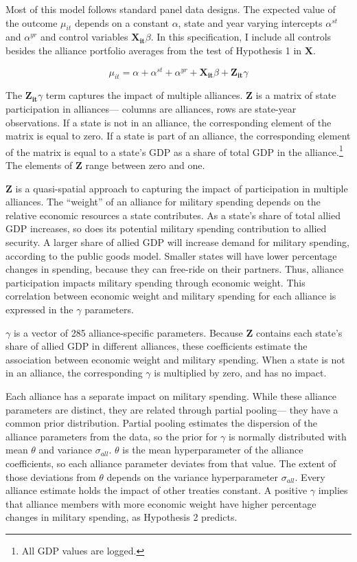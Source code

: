 \documentclass[12pt]{article}
\begin{document}
Most of this model follows standard panel data designs.
The expected value of the outcome $\mu_{it}$ depends on a constant $\alpha$, state and year varying intercepts $\alpha^{st}$ and $\alpha^{yr}$ and control variables $\mathbf{X_{it}} \beta$. 
In this specification, I include all controls besides the alliance portfolio averages from the test of Hypothesis 1 in $\mathbf{X}$.


\begin{equation}
\mu_{it} = \alpha + \alpha^{st} + \alpha^{yr} + \mathbf{X_{it}} \beta + \mathbf{Z_{it}} \gamma 
\end{equation}


The $\mathbf{Z_{it}} \gamma$ term captures the impact of multiple alliances. 
\textbf{Z} is a matrix of state participation in alliances--- columns are alliances, rows are state-year observations. 
If a state is not in an alliance, the corresponding element of the matrix is equal to zero. 
If a state is part of an alliance, the corresponding element of the matrix is equal to a state's GDP as a share of total GDP in the alliance.\footnote{All GDP values are logged.} 
The elements of \textbf{Z} range between zero and one. 


\textbf{Z} is a quasi-spatial approach to capturing the impact of participation in multiple alliances.
The ``weight'' of an alliance for military spending depends on the relative economic resources a state contributes.  
As a state's share of total allied GDP increases, so does its potential military spending contribution to allied security.  
A larger share of allied GDP will increase demand for military spending, according to the public goods model. 
Smaller states will have lower percentage changes in spending, because they can free-ride on their partners.
Thus, alliance participation impacts military spending through economic weight. 
This correlation between economic weight and military spending for each alliance is expressed in the $\gamma$ parameters. 


$\gamma$ is a vector of 285 alliance-specific parameters.  
Because \textbf{Z} contains each state's share of allied GDP in different alliances, these coefficients estimate the association between economic weight and military spending. 
When a state is not in an alliance, the corresponding $\gamma$ is multiplied by zero, and has no impact. 


Each alliance has a separate impact on military spending.
While these alliance parameters are distinct, they are related through partial pooling--- they have a common prior distribution.
Partial pooling estimates the dispersion of the alliance parameters from the data, so the prior for $\gamma$ is normally distributed with mean $\theta$ and variance $\sigma_{all}$. 
$\theta$ is the mean hyperparameter of the alliance coefficients, so each alliance parameter deviates from that value.
The extent of those deviations from $\theta$ depends on the variance hyperparameter $\sigma_{all}$.
Every alliance estimate holds the impact of other treaties constant. 
A positive $\gamma$ implies that alliance members with more economic weight have higher percentage changes in military spending, as Hypothesis 2 predicts. 
    
\end{document}

